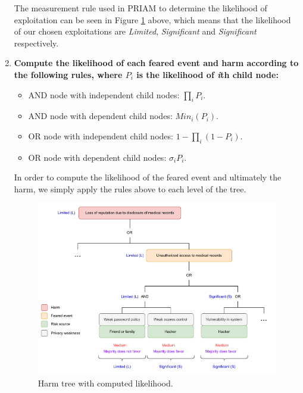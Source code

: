 \begin{enumerate}
        The measurement rule used in PRIAM to determine the likelihood of
        exploitation can be seen in Figure \ref{fig:measurement} above, which means that
        the likelihood of our chosen exploitations are \textit{Limited},
        \textit{Significant} and \textit{Significant} respectively.

  \item{\textbf{Compute the likelihood of each feared event and harm according to the following
        rules, where $P_i$ is the likelihood of \textit{i}th child node:}}
        \begin{itemize}
          \item AND node with independent child nodes: $\prod_{i}P_{i}$.
          \item AND node with dependent child nodes: $Min_{i}(P_{i})$.
          \item OR node with independent child nodes: $1-\prod_{i}(1-P_{i})$.
          \item OR node with dependent child nodes: $\sigma_{i}P_{i}$.
        \end{itemize}

        In order to compute the likelihood of the feared event and ultimately
        the harm, we simply apply the rules above to each level of the tree.

        \begin{figure}[hbt!]
          \centering
          \includegraphics[width=\textwidth]{pictures/harm_tree_wrl.png}
          \caption{Harm tree with computed likelihood.}
          \label{fig:measurement}
        \end{figure}
\end{enumerate}
